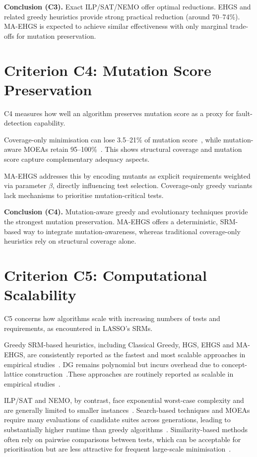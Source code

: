 \textbf{Conclusion (C3).} Exact ILP/SAT/NEMO offer optimal reductions. EHGS and related greedy heuristics provide strong practical reduction (around 70--74\%). MA-EHGS is expected to achieve similar effectiveness with only marginal trade-offs for mutation preservation.

\section{Criterion C4: Mutation Score Preservation}

C4 measures how well an algorithm preserves mutation score as a proxy for fault-detection capability.

Coverage-only minimisation can lose 3.5--21\% of mutation score~\cite{noemmer2020,jehan2023}, while mutation-aware MOEAs retain 95--100\%~\cite{wei2017}. This shows structural coverage and mutation score capture complementary adequacy aspects.

MA-EHGS addresses this by encoding mutants as explicit requirements weighted via parameter $\beta$, directly influencing test selection. Coverage-only greedy variants lack mechanisms to prioritise mutation-critical tests.

\textbf{Conclusion (C4).} Mutation-aware greedy and evolutionary techniques provide the strongest mutation preservation. MA-EHGS offers a deterministic, SRM-based way to integrate mutation-awareness, whereas traditional coverage-only heuristics rely on structural coverage alone.

\section{Criterion C5: Computational Scalability}

C5 concerns how algorithms scale with increasing numbers of tests and requirements, as encountered in LASSO’s SRMs.

Greedy SRM-based heuristics, including Classical Greedy, HGS, EHGS and MA-EHGS, are consistently reported as the fastest and most scalable approaches in empirical studies~\cite{gladston2015,noemmer2020,jehan2023}. DG remains polynomial but incurs overhead due to concept-lattice construction~\cite{tallam2005}.These approaches are routinely reported as scalable in empirical studies~\cite{gladston2015,noemmer2020,jehan2023}.

ILP/SAT and NEMO, by contrast, face exponential worst-case complexity and are generally limited to smaller instances~\cite{elbaum2002,yoo2012,lin2018}. Search-based techniques and MOEAs require many evaluations of candidate suites across generations, leading to substantially higher runtime than greedy algorithms~\cite{yoo2012,khan2020,wei2017}. Similarity-based methods often rely on pairwise comparisons between tests, which can be acceptable for prioritisation but are less attractive for frequent large-scale minimisation~\cite{bach2017}.

